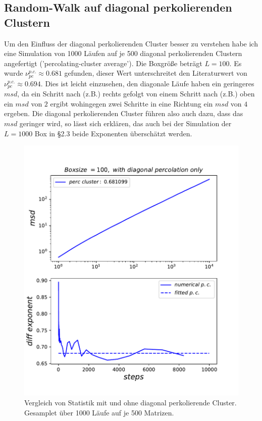 \documentclass[a4paper, 12pt]{report}
\begin{document}
\subsection{Random-Walk auf diagonal perkolierenden Clustern}
Um den Einfluss der diagonal perkolierenden Cluster besser zu verstehen habe ich eine Simulation von 1000 Läufen auf je 500 diagonal perkolierenden Clustern angefertigt ('percolating-cluster average'). Die Boxgröße beträgt $L=100$. Es wurde $\nu_{pc}^{p.c.} \approx 0.681$ gefunden, dieser Wert unterschreitet den Literaturwert von $\nu_{pc}^{p.c.} \approx 0.694$. Dies ist leicht einzusehen, den diagonale Läufe haben ein geringeres $msd$, da ein Schritt nach (z.B.) rechts gefolgt von einem Schritt nach (z.B.) oben ein $msd$ von $2$ ergibt wohingegen zwei Schritte in eine Richtung ein $msd$ von $4$ ergeben. Die diagonal perkolierenden Cluster führen also auch dazu, dass das $msd$ geringer wird, so lässt sich erklären, das auch bei der Simulation der $L=1000$ Box in §2.3 beide Exponenten überschätzt werden.

\begin{figure}[h!]
	\centering
	\includegraphics[scale=0.9]{diagpc100.pdf}
	\caption{Vergleich von Statistik mit und ohne diagonal perkolierende Cluster. Gesamplet über 1000 Läufe auf je 500 Matrizen.}
\end{figure}
\end{document}
